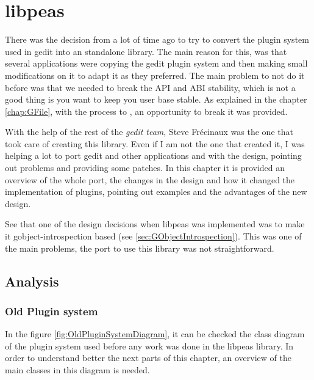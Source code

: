 
\chapter{libpeas}

There was the decision from a lot of time ago to try to convert the plugin system used in gedit into an standalone library. The main reason for this, was that several applications were copying the gedit plugin system and then making small modifications on it to adapt it as they preferred. The main problem to not do it before was that we needed to break the API and ABI stability, which is not a good thing is you want to keep you user base stable. As explained in the chapter \ref{chap:GFile}, with the process to , an opportunity to break it was provided.

With the help of the rest of the \emph{gedit team}, Steve Fr\'ecinaux was the one that took care of creating this library. Even if I am not the one that created it, I was helping a lot to port gedit and other applications and with the design, pointing out problems and providing some patches. In this chapter it is provided an overview of the whole port, the changes in the design and how it changed the implementation of plugins, pointing out examples and the advantages of the new design.

See that one of the design decisions when libpeas was implemented was to make it gobject-introspection based (see \ref{sec:GObjectIntrospection}). This was one of the main problems, the port to use this library was not straightforward.

\section{Analysis}

\subsection{Old Plugin system}\label{sec:OldPluginSystem}


In the figure \ref{fig:OldPluginSystemDiagram}, it can be checked the class diagram of the plugin system used before any work was done in the libpeas library. In order to understand better the next parts of this chapter, an overview of the main classes in this diagram is needed.

